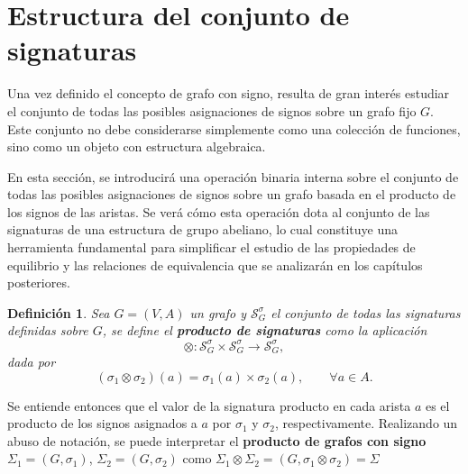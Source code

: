 \documentclass[11pt,a4paper,spanish]{report}
\theoremstyle{plain}
\newtheorem{definicion}{Definición}[chapter]
\begin{document}
\section{Estructura del conjunto de signaturas}

Una vez definido el concepto de grafo con signo, resulta de gran interés estudiar el conjunto de todas las posibles asignaciones de signos sobre un grafo fijo $G$. Este conjunto no debe considerarse simplemente como una colección de funciones, sino como un objeto con estructura algebraica.

En esta sección, se introducirá una operación binaria interna sobre el conjunto de todas las posibles asignaciones de signos sobre un grafo basada en el producto de los signos de las aristas. Se verá cómo esta operación dota al conjunto de las signaturas de una estructura de grupo abeliano, lo cual constituye una herramienta fundamental para simplificar el estudio de las propiedades de equilibrio y las relaciones de equivalencia que se analizarán en los capítulos posteriores. 


\begin{definicion}
Sea $G=(V,A)$ un grafo y $\mathcal{S}^\sigma_G$
el conjunto de todas las signaturas definidas sobre $G$, se define el \textbf{producto de signaturas} como la aplicación
\[
\otimes :\mathcal{S}^\sigma_G \times \mathcal{S}^\sigma_G \longrightarrow \mathcal{S}^\sigma_G,
\]
dada por
\[
(\sigma_1 \otimes\sigma_2)(a) = \sigma_1(a)\times\sigma_2(a), \qquad \forall a \in A.
\]


\end{definicion}

Se entiende entonces que el valor de la signatura producto en cada arista $a$ es el producto de los signos asignados a $a$ por $\sigma_1$ y $\sigma_2$, respectivamente. 
Realizando un abuso de notación, se puede interpretar el \textbf{producto de grafos con signo} 
$\Sigma_1=(G,\sigma_1)$, $\Sigma_2=(G,\sigma_2)$ como
$
\Sigma_1\otimes\Sigma_2=(G,\sigma_1 \otimes \sigma_2) = \Sigma
$

\end{document}
